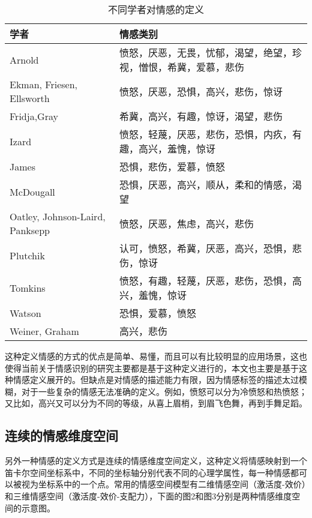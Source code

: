 \begin{table}[htb]
  \centering
  \begin{minipage}[t]{0.8\linewidth} %
  \caption{不同学者对情感的定义}
  \label{tab:emo_categories}
    \begin{tabularx}{\linewidth}{X<{\centering} X<{\centering}}
        \toprule[1.5pt]
        学者 & 情感类别 \\
        \midrule[1pt]
        Arnold & 愤怒，厌恶，无畏，忧郁，渴望，绝望，珍视，憎恨，希冀，爱慕，悲伤 \\
        Ekman, Friesen, Ellsworth & 愤怒，厌恶，恐惧，高兴，悲伤，惊讶 \\
        Fridja,Gray & 希冀，高兴，有趣，惊讶，渴望，悲伤 \\
        Izard & 愤怒，轻蔑，厌恶，悲伤，恐惧，内疚，有趣，高兴，羞愧，惊讶 \\
        James & 恐惧，悲伤，爱慕，愤怒 \\
        McDougall & 恐惧，厌恶，高兴，顺从，柔和的情感，渴望 \\
        Oatley, Johnson-Laird, Panksepp & 愤怒，厌恶，焦虑，高兴，悲伤 \\
        Plutchik & 认可，愤怒，希冀，厌恶，高兴，恐惧，悲伤，惊讶 \\
        Tomkins & 愤怒，有趣，轻蔑，厌恶，悲伤，恐惧，高兴，羞愧，惊讶 \\
        Watson & 恐惧，爱慕，愤怒 \\
        Weiner, Graham & 高兴，悲伤 \\
        \bottomrule[1.5pt]
    \end{tabularx}
  \end{minipage}
\end{table}

这种定义情感的方式的优点是简单、易懂，而且可以有比较明显的应用场景，这也使得当前关于情感识别的研究主要都是基于这种定义进行的，本文也主要是基于这种情感定义展开的。但缺点是对情感的描述能力有限，因为情感标签的描述太过模糊，对于一些复杂的情感无法准确的定义。例如，愤怒可以分为冷愤怒和热愤怒；又比如，高兴又可以分为不同的等级，从喜上眉梢，到眉飞色舞，再到手舞足蹈。

\subsection{连续的情感维度空间}
\label{ssec:continuous_space}
另外一种情感的定义方式是连续的情感维度空间定义，这种定义将情感映射到一个笛卡尔空间坐标系中，不同的坐标轴分别代表不同的心理学属性，每一种情感都可以被视为坐标系中的一个点。常用的情感空间模型有二维情感空间（激活度-效价）和三维情感空间（激活度-效价-支配力），下面的图2和图3分别是两种情感维度空间的示意图。

